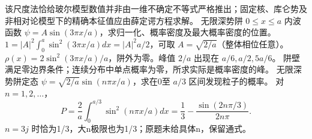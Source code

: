 \crosscheck 该尺度法恰给玻尔模型数值并非由一维不确定不等式严格推出；固定核、库仑势及非相对论模型下的精确本征值应由薛定谔方程求解。
\problemtext 无限深势阱 $0\le x\le a$ 内波函数 $\psi=A\sin(3\pi x/a)$，求归一化、概率密度及最大概率密度的位置。
\workings $1=|A|^2\int_0^a\sin^2(3\pi x/a)dx=|A|^2a/2$，可取 $A=\sqrt{2/a}$（整体相位任意）。$\rho(x)=2\sin^2(3\pi x/a)/a$，阱外为零。峰值 $2/a$ 出现在 $a/6,a/2,5a/6$。
\crosscheck 阱壁满足零边界条件；连续分布中单点概率为零，所求实际是概率密度的峰。
\problemtext 无限深势阱定态 $\psi=\sqrt{2/a}\sin(n\pi x/a)$，求在0至 $a/3$ 区间发现粒子的概率。
\workings 对 $n=1,2,\ldots$，
\[
P=\frac2a\int_0^{a/3}\sin^2(n\pi x/a)dx
=\frac13-\frac{\sin(2n\pi/3)}{2n\pi}.
\]
\crosscheck $n=3j$ 时恰为1/3，大n极限也为1/3；原题未给具体n，保留通式。

